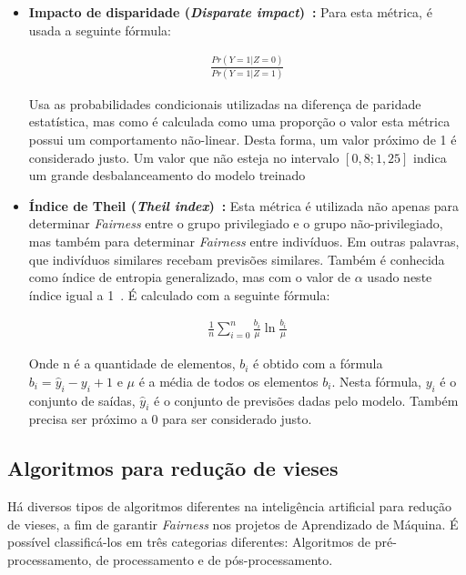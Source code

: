 \documentclass[portugues]{ic-tese}
\begin{document}
\begin{itemize}
\item \textbf{Impacto de disparidade (\textit{Disparate impact})~\citep{Biswas_2020}:} Para esta métrica, é usada a seguinte fórmula:

\begin{align*}
\frac{Pr(Y=1|Z=0)}{Pr(Y=1|Z=1)}
\end{align*}

Usa as probabilidades condicionais utilizadas na diferença de paridade estatística, mas como é calculada como uma proporção o valor esta métrica possui um comportamento não-linear. Desta forma, um valor próximo de 1 é considerado justo. Um valor que não esteja no intervalo $\left[0,8; 1,25 \right]$ indica um grande desbalanceamento do modelo treinado~\citep{Feldman_2015}

\item \textbf{Índice de Theil (\textit{Theil index})~\citep{Speicher_2018}:} Esta métrica é utilizada não apenas para determinar \textit{Fairness} entre o grupo privilegiado e o grupo não-privilegiado, mas também para determinar \textit{Fairness} entre indivíduos. Em outras palavras, que indivíduos similares recebam previsões similares. Também é conhecida como índice de entropia generalizado, mas com o valor de $\alpha$ usado neste índice igual a 1~\citep{Speicher_2018}. É calculado com a seguinte fórmula:

\begin{align*}
\frac{1}{n}\sum^{n}_{i=0}\frac{b_i}{\mu}\ln{\frac{b_i}{\mu}}
\end{align*}

Onde n é a quantidade de elementos, $b_i$ é obtido com a fórmula $b_i = \hat{y}_i - y_i + 1$ e $\mu$ é a média de todos os elementos $b_i$. Nesta fórmula, $y_i$ é o conjunto de saídas, $\hat{y}_i$ é o conjunto de previsões dadas pelo modelo. Também precisa ser próximo a 0 para ser considerado justo.

\end{itemize}

\subsection{Algoritmos para redução de vieses}
\label{sec:FairnessAlgorithms}

Há diversos tipos de algoritmos diferentes na inteligência artificial para redução de vieses, a fim de garantir \textit{Fairness} nos projetos de Aprendizado de Máquina. É possível classificá-los em três categorias diferentes: Algoritmos de pré-processamento, de processamento e de pós-processamento.
\end{document}
